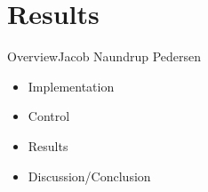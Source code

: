 \section{Results}

\begin{frame}{Overview}{Jacob Naundrup Pedersen}
\begin{itemize}
	
\item Implementation
\item Control
\item Results
\item Discussion/Conclusion
\end{itemize}
\end{frame}

